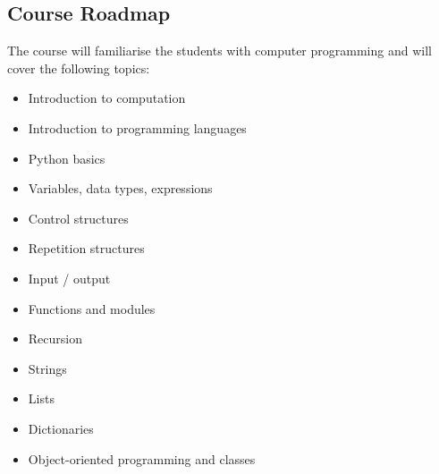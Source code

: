 \documentclass[t,handout,9pt]{beamer}
\begin{document}
\subsection{Course Roadmap}
\begin{frame}
\vfill
The course will familiarise the students with computer programming and will cover the following topics:
\begin{itemize}
\item Introduction to computation
\item Introduction to programming languages
\item Python basics
\item Variables, data types, expressions
\item Control structures
\item Repetition structures
\item Input / output
\item Functions and modules
\item Recursion
\item Strings
\item Lists
\item Dictionaries
\item Object-oriented programming and classes
\end{itemize}
\vfill
\end{frame}
%
%
%
\end{document}
